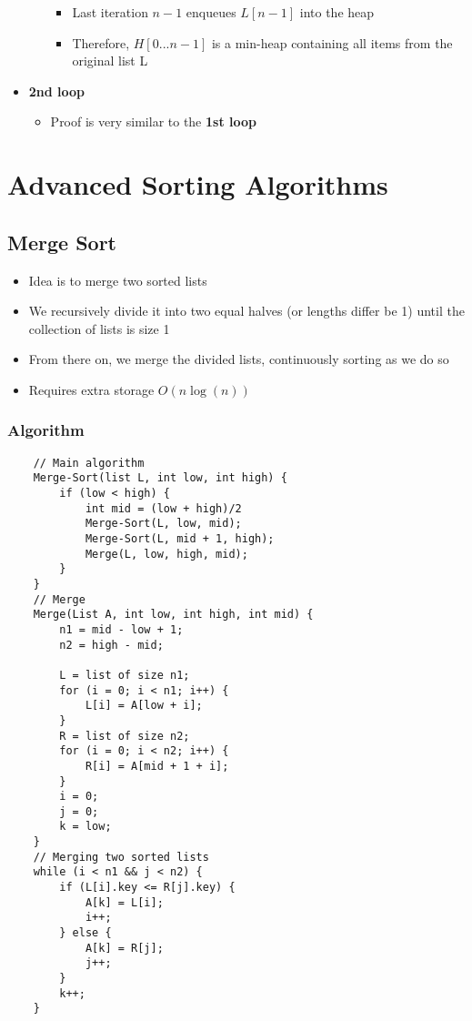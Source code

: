 \documentclass[10pt, 
a4paper, 
oneside, 
headinclude, footinclude, 
BCOR5mm]
{scrartcl}
\begin{document}
\begin{definition}
\begin{itemize}
\begin{itemize}
\begin{itemize}
                \item Last iteration $n-1$ enqueues $L[n-1]$ into the heap
                \item Therefore, $H[0...n-1]$ is a min-heap containing all items from the original list L
            \end{itemize}
        \end{itemize}
        \item \textbf{2nd loop}
        \begin{itemize}
            \item Proof is very similar to the \textbf{1st loop}
        \end{itemize}
    \end{itemize}
\end{definition}
\newpage
\section{Advanced Sorting Algorithms}
\subsection{Merge Sort}
\begin{itemize}
    \item Idea is to merge two sorted lists
    \item We recursively divide it into two equal halves (or lengths differ be 1) until the collection of lists is size 1
    \item From there on, we merge the divided lists, continuously sorting as we do so
    \item Requires extra storage $O(n\log(n))$
\end{itemize}
\subsubsection{Algorithm}
\begin{lstlisting}
    // Main algorithm
    Merge-Sort(list L, int low, int high) {
        if (low < high) {
            int mid = (low + high)/2
            Merge-Sort(L, low, mid);
            Merge-Sort(L, mid + 1, high);
            Merge(L, low, high, mid);
        }
    }
    // Merge
    Merge(List A, int low, int high, int mid) {
        n1 = mid - low + 1;
        n2 = high - mid;

        L = list of size n1;
        for (i = 0; i < n1; i++) {
            L[i] = A[low + i];
        }
        R = list of size n2;
        for (i = 0; i < n2; i++) {
            R[i] = A[mid + 1 + i];
        }
        i = 0;
        j = 0;
        k = low;
    }
    // Merging two sorted lists
    while (i < n1 && j < n2) {
        if (L[i].key <= R[j].key) {
            A[k] = L[i];
            i++;
        } else {
            A[k] = R[j];
            j++;
        }
        k++;
    }
\end{lstlisting}
\end{document}
